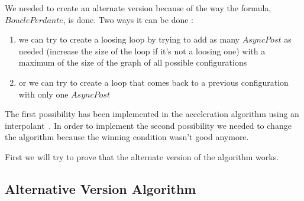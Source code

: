 \documentclass{article}
\begin{document}
We needed to create an alternate version because of the way the formula, $BouclePerdante$, is done. Two ways it can be done :
\begin{enumerate}
    \item we can try to create a loosing loop by trying to add as many $AsyncPost$ as needed (increase the size of the loop if it's not a loosing one) with a maximum of the size of the graph of all possible configurations
    \item or we can try to create a loop that comes back to a previous configuration with only one $AsyncPost$
\end{enumerate}

The first possibility has been implemented in the acceleration algorithm using an interpolant~\cite{algo}. In order to implement the second possibility we needed to change the algorithm because the winning condition wasn't good anymore.

First we will try to prove that the alternate version of the algorithm works.

\subsection{Alternative Version Algorithm}

\begin{algorithm}
\end{algorithm}
\newpage
\end{document}
